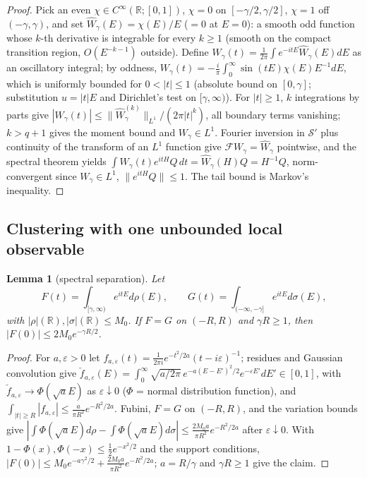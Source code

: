 \documentclass[11pt,a4paper]{article}
\theoremstyle{plain}
\newtheorem{lemma}[theorem]{Lemma}
\theoremstyle{definition}
\newcommand{\R}{\mathbb{R}}
\begin{document}
\begin{proof}
Pick an even $\chi\in C^\infty(\R;[0,1])$, $\chi=0$ on $[-\gamma/2,\gamma/2]$, $\chi=1$ off
$(-\gamma,\gamma)$, and set $\widehat W_\gamma(E)=\chi(E)/E$ ($=0$ at $E=0$): a smooth odd
function whose $k$-th derivative is integrable for every $k\ge1$ (smooth on the compact
transition region, $O(E^{-k-1})$ outside). Define
$W_\gamma(t)=\frac1{2\pi}\int e^{-itE}\widehat W_\gamma(E)dE$ as an oscillatory integral; by
oddness, $W_\gamma(t)=-\frac i\pi\int_0^\infty\sin(tE)\chi(E)E^{-1}dE$, which is uniformly
bounded for $0<|t|\le1$ (absolute bound on $[0,\gamma]$; substitution $u=|t|E$ and Dirichlet's
test on $[\gamma,\infty)$). For $|t|\ge1$, $k$ integrations by parts give
$|W_\gamma(t)|\le\|\widehat W_\gamma^{(k)}\|_{L^1}/(2\pi|t|^k)$, all boundary terms vanishing;
$k>q+1$ gives the moment bound and $W_\gamma\in L^1$. Fourier inversion in $\mathcal S'$ plus
continuity of the transform of an $L^1$ function give
$\mathcal FW_\gamma=\widehat W_\gamma$ pointwise, and the spectral theorem yields
$\int W_\gamma(t)e^{itH}Q\,dt=\widehat W_\gamma(H)Q=H^{-1}Q$, norm-convergent since
$W_\gamma\in L^1$, $\|e^{itH}Q\|\le1$. The tail bound is Markov's inequality.
\end{proof}

\subsection{Clustering with one unbounded local observable}

\begin{lemma}[spectral separation]\label{lem:spectral-main}
Let
\[
 F(t)=\int_{[\gamma,\infty)}e^{itE}d\rho(E),\qquad
 G(t)=\int_{(-\infty,-\gamma]}e^{itE}d\sigma(E),
\]
with
$|\rho|(\R),|\sigma|(\R)\le M_0$. If $F=G$ on $(-R,R)$ and $\gamma R\ge1$, then
$|F(0)|\le2M_0e^{-\gamma R/2}$.
\end{lemma}

\begin{proof}
For $a,\varepsilon>0$ let $f_{a,\varepsilon}(t)=\frac1{2\pi i}e^{-t^2/2a}(t-i\varepsilon)^{-1}$;
residues and Gaussian convolution give
$\check f_{a,\varepsilon}(E)=\int_0^\infty\sqrt{a/2\pi}\,e^{-a(E-E')^2/2}e^{-\varepsilon E'}dE'
\in[0,1]$, with $\check f_{a,\varepsilon}\to\Phi(\sqrt aE)$ as $\varepsilon\downarrow0$
($\Phi$ = normal distribution function), and
$\int_{|t|\ge R}|f_{a,\varepsilon}|\le\frac a{\pi R^2}e^{-R^2/2a}$. Fubini, $F=G$ on $(-R,R)$,
and the variation bounds give
$|\int\Phi(\sqrt aE)d\rho-\int\Phi(\sqrt aE)d\sigma|\le\frac{2M_0a}{\pi R^2}e^{-R^2/2a}$
after $\varepsilon\downarrow0$. With $1-\Phi(x),\Phi(-x)\le\frac12e^{-x^2/2}$ and the support
conditions, $|F(0)|\le M_0e^{-a\gamma^2/2}+\frac{2M_0a}{\pi R^2}e^{-R^2/2a}$; $a=R/\gamma$ and
$\gamma R\ge1$ give the claim.
\end{proof}
\end{document}
